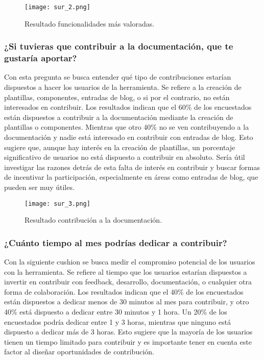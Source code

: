 \begin{figure}[!h]
    \centering
    \texttt{[image: sur\_2.png]}
    \caption{Resultado funcionalidades más valoradas.}
    \label{fig:sur_2}
\end{figure}


\subsubsection{¿Si tuvieras que contribuir a la documentación, que te gustaría aportar?}

Con esta pregunta se busca entender qué tipo de contribuciones estarían dispuestos
a hacer los usuarios de la herramienta. Se refiere a la creación de plantillas,
componentes, entradas de blog, o si por el contrario, no están interesados en contribuir.
Los resultados indican que el 60\% de los encuestados están dispuestos a contribuir 
a la documentación mediante la creación de plantillas o componentes. 
Mientras que otro 40\% no se ven contribuyendo a la documentación y nadie está interesado 
en contribuir con entradas de blog. Esto sugiere que, aunque hay interés en la creación 
de plantillas, un porcentaje significativo de usuarios no está dispuesto a contribuir 
en absoluto. Sería útil investigar las razones detrás de esta falta de interés en 
contribuir y buscar formas de incentivar la participación, especialmente en áreas como 
entradas de blog, que pueden ser muy útiles.

\begin{figure}[!h]
    \centering
    \texttt{[image: sur\_3.png]}
    \caption{Resultado contribución a la documentación.}
    \label{fig:sur_3}
\end{figure}


\subsubsection{¿Cuánto tiempo al mes podrías dedicar a contribuir?}

Con la siguiente cushion se busca medir el compromiso potencial de los usuarios con la 
herramienta. Se refiere al tiempo que los usuarios estarían dispuestos a invertir 
en contribuir con feedback, desarrollo, documentación, o cualquier otra 
forma de colaboración. 
Los resultados indican que el 40\% de los encuestados están dispuestos a dedicar menos 
de 30 minutos al mes para contribuir, y otro 40\% está dispuesto a dedicar entre 30 
minutos y 1 hora. Un 20\% de los encuestados podría dedicar entre 1 y 3 horas, 
mientras que ninguno está dispuesto a dedicar más de 3 horas. Esto sugiere que la 
mayoría de los usuarios tienen un tiempo limitado para contribuir y es importante 
tener en cuenta este factor al diseñar oportunidades de contribución.

